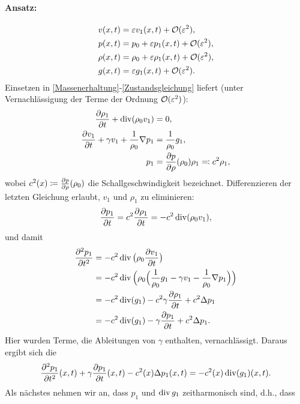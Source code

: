 \paragraph{Ansatz:}
\begin{align*}
	v(x,t)&=\varepsilon v_1(x,t)+\mathcal{O}(\varepsilon^2),\\
	p(x,t)&=p_0+\varepsilon p_1(x,t)+\mathcal{O}(\varepsilon^2),\\
	\rho(x,t)&=\rho_0+\varepsilon\rho_1(x,t)+\mathcal{O}(\varepsilon^2),\\
	g(x,t)&=\varepsilon g_1(x,t)+\mathcal{O}(\varepsilon^2).
\end{align*}
Einsetzen in \eqref{Massenerhaltung}-\eqref{Zustandsgleichung} liefert (unter Vernachlässigung der Terme der Ordnung \(\mathcal{O}(\varepsilon^2)\)):
\begin{align*}
	\frac{\partial \rho_1}{\partial t}+\operatorname{div}(\rho_0v_1)&=0,\\
	\frac{\partial v_1}{\partial t}+\gamma v_1+\frac{1}{\rho_0}\nabla p_1&=\frac{1}{\rho_0}g_1,\\
	p_1&={\frac{\partial p}{\partial\rho}(\rho_0)}\rho_1\eqqcolon c^2\rho_1,
\end{align*}
wobei \(c^2(x)\coloneqq\frac{\partial p}{\partial\rho}(\rho_0)\) die Schallgeschwindigkeit bezeichnet.
Differenzieren der letzten Gleichung erlaubt, \(v_1\) und \(\rho_1\) zu eliminieren:
\begin{equation*}
	\frac{\partial p_1}{\partial t} = c^2\frac{\partial \rho_1}{\partial t}=-c^2\operatorname{div}(\rho_0v_1),
\end{equation*}
und damit
\begin{align*}
	\frac{\partial ^2p_1}{\partial t^2}&=-c^2\operatorname{div}\big(\rho_0\frac{\partial v_1}{\partial t}\big)\\
	&=-c^2\operatorname{div}\Big(\rho_0\Big(\frac{1}{\rho_0}g_1-\gamma v_1-\frac{1}{\rho_0}\nabla p_1\Big)\Big)\\
	&=-c^2\operatorname{div}(g_1)-c^2\gamma\frac{\partial \rho_1}{\partial t}+c^2\Delta p_1\\
	&=-c^2\operatorname{div}(g_1)-\gamma\frac{\partial p_1}{\partial t}+c^2\Delta p_1.
\end{align*}
Hier wurden Terme, die Ableitungen von \(\gamma\) enthalten, vernachlässigt. Daraus ergibt sich die 
\begin{equation}
	\label{Wellengleichung}
	\frac{\partial^2p_1}{\partial t^2}(x,t)+\gamma\frac{\partial p_1}{\partial t}(x,t)-c^2(x)\Delta p_1(x,t)=-c^2(x)\operatorname{div}(g_1)(x,t).
\end{equation}
Als nächstes nehmen wir an, dass \(p_1\) und \(\operatorname{div} g_1\) zeitharmonisch sind, d.h., dass
